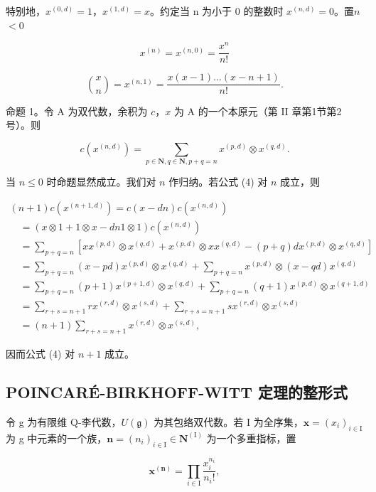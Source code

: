 特别地，\(x^{(0,d)} = 1\)，\(x^{(1,d)} = x\)。约定当 n 为小于 0 的整数时 \(x^{(n,d)} = 0\)。置\(n\)\(< 0\)

\[
x ^ {(n)} = x ^ {(n, 0)} = \frac {x ^ {n}}{n !}\tag{2}
\]

\[
\binom {x} {n} = x ^ {(n, 1)} = \frac {x (x - 1) \ldots (x - n + 1)}{n !}.\tag{3}
\]

命题 1。令 A 为双代数，余积为 \(c\)，\(x\) 为 A 的一个本原元（第 II 章第1节第2号）。则

\[
c (x ^ {(n, d)}) = \sum_ {p \in \mathbf {N}, q \in \mathbf {N}, p + q = n} x ^ {(p, d)} \otimes x ^ {(q, d)}.\tag{4}
\]

当 \(n \leq 0\) 时命题显然成立。我们对 \(n\) 作归纳。若公式 (4) 对 \(n\) 成立，则

\[
\begin{array}{l} (n + 1) c (x ^ {(n + 1, d)}) = c (x - d n) c (x ^ {(n, d)}) \\ \quad = (x \otimes 1 + 1 \otimes x - d n   1 \otimes 1) c (x ^ {(n, d)}) \\ \quad = \sum_ {p + q = n} [ x x ^ {(p, d)} \otimes x ^ {(q, d)} + x ^ {(p, d)} \otimes x x ^ {(q, d)} - (p + q) d x ^ {(p, d)} \otimes x ^ {(q, d)} ] \\ \quad = \sum_ {p + q = n} (x - p d) x ^ {(p, d)} \otimes x ^ {(q, d)} + \sum_ {p + q = n} x ^ {(p, d)} \otimes (x - q d) x ^ {(q, d)} \\ \quad = \sum_ {p + q = n} (p + 1) x ^ {(p + 1, d)} \otimes x ^ {(q, d)} + \sum_ {p + q = n} (q + 1) x ^ {(p, d)} \otimes x ^ {(q + 1, d)} \\ \quad = \sum_ {r + s = n + 1} r x ^ {(r, d)} \otimes x ^ {(s, d)} + \sum_ {r + s = n + 1} s x ^ {(r, d)} \otimes x ^ {(s, d)} \\ \quad = (n + 1) \sum_ {r + s = n + 1} x ^ {(r, d)} \otimes x ^ {(s, d)}, \end{array}
\]

因而公式 (4) 对 \(n + 1\) 成立。

\subsection{POINCAR\'E-BIRKHOFF-WITT 定理的整形式}

令 g 为有限维 Q-李代数，\(U(\mathfrak{g})\) 为其包络双代数。若 I 为全序集，\(\mathbf{x} = (x_i)_{i \in \mathrm{I}}\) 为 g 中元素的一个族，\(\mathbf{n} = (n_i)_{i \in \mathrm{I}} \in \mathbf{N}^{(\mathrm{I})}\) 为一个多重指标，置

\[
\mathbf {x} ^ {(\mathbf {n})} = \prod_ {i \in \mathrm{I}} \frac {x _ {i} ^ {n _ {i}}}{n _ {i} !},\tag{5}
\]

